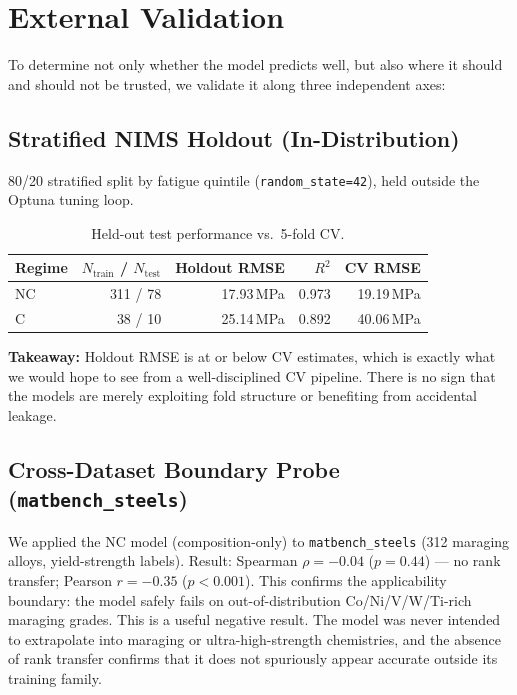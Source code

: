 \documentclass[12pt,a4paper]{article} %
\begin{document}
\section{External Validation}\label{sec:ext}

To determine not only whether the model predicts well, but also where it should and
should not be trusted, we validate it along three independent axes:

\subsection{Stratified NIMS Holdout (In-Distribution)}
80/20 stratified split by fatigue quintile (\texttt{random\_state=42}), held outside the
Optuna tuning loop.

\begin{table}[H]
\centering
\caption{Held-out test performance vs.\ 5-fold CV.}
\label{tab:holdout}
\begin{tabular}{lrrrr}
\toprule
\textbf{Regime} & \textbf{$N_{\text{train}}$ / $N_{\text{test}}$} & \textbf{Holdout RMSE} & \textbf{$R^2$} & \textbf{CV RMSE} \\
\midrule
NC & 311 / 78 & 17.93\,MPa & 0.973 & 19.19\,MPa \\
C  & 38 / 10  & 25.14\,MPa & 0.892 & 40.06\,MPa \\
\bottomrule
\end{tabular}
\end{table}

\textbf{Takeaway:} Holdout RMSE is at or below CV estimates, which is exactly what we
would hope to see from a well-disciplined CV pipeline. There is no sign that the models
are merely exploiting fold structure or benefiting from accidental leakage.

\subsection{Cross-Dataset Boundary Probe (\texttt{matbench\_steels})}
We applied the NC model (composition-only) to \texttt{matbench\_steels} (312 maraging alloys, yield-strength labels). Result: Spearman $\rho=-0.04$ ($p=0.44$) — no rank transfer; Pearson $r=-0.35$ ($p<0.001$). This confirms the applicability boundary: the model safely fails on out-of-distribution Co/Ni/V/W/Ti-rich maraging grades.
This is a useful negative result. The model was never intended to extrapolate into
maraging or ultra-high-strength chemistries, and the absence of rank transfer confirms that
it does not spuriously appear accurate outside its training family.
\end{document}

